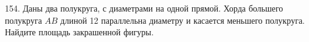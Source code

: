 154. Даны два полукруга, с диаметрами на одной прямой.
Хорда большего полукруга $AB$ длиной 12 параллельна диаметру и касается
меньшего полукруга. Найдите площадь закрашенной фигуры.
\begin{figure}[h]
\end{figure}\\

